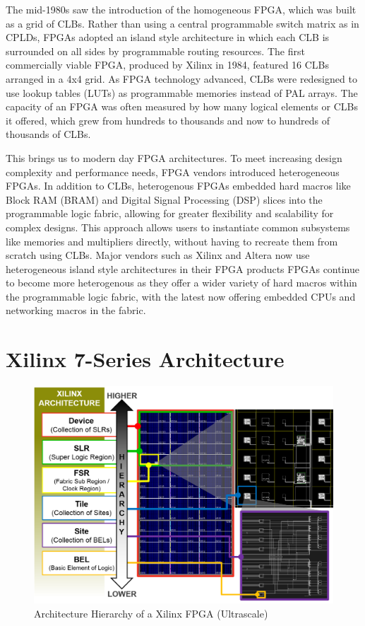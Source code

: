 \documentclass[twocolumn]{article}
\begin{document}
    The mid-1980s saw the introduction of the homogeneous FPGA, which was built as a grid of CLBs. 
    Rather than using a central programmable switch matrix as in CPLDs, FPGAs adopted an island style architecture in which each CLB is surrounded on all sides by programmable routing resources. 
    The first commercially viable FPGA, produced by Xilinx in 1984, featured 16 CLBs arranged in a 4x4 grid. 
    As FPGA technology advanced, CLBs were redesigned to use lookup tables (LUTs) as programmable memories instead of PAL arrays. 
    The capacity of an FPGA was often measured by how many logical elements or CLBs it offered, which grew from hundreds to thousands and now to hundreds of thousands of CLBs.

    This brings us to modern day FPGA architectures. 
    To meet increasing design complexity and performance needs, FPGA vendors introduced heterogeneous FPGAs. 
    In addition to CLBs, heterogenous FPGAs embedded hard macros like Block RAM (BRAM) and Digital Signal Processing (DSP) slices into the programmable logic fabric, allowing for greater flexibility and scalability for complex designs.
    This approach allows users to instantiate common subsystems like memories and multipliers directly, without having to recreate them from scratch using CLBs. 
    Major vendors such as Xilinx and Altera now use heterogeneous island style architectures in their FPGA products 
    FPGAs continue to become more heterogenous as they offer a wider variety of hard macros within the programmable logic fabric, with the latest now offering embedded CPUs and networking macros in the fabric. 

\section{Xilinx 7-Series Architecture}

    \begin{figure}
        \centering
        \includegraphics[width=\textwidth]{figures/hierarchy.png}
        \caption{Architecture Hierarchy of a Xilinx FPGA (Ultrascale)}
        \label{fig:hierarchy}
    \end{figure}
\end{document}
